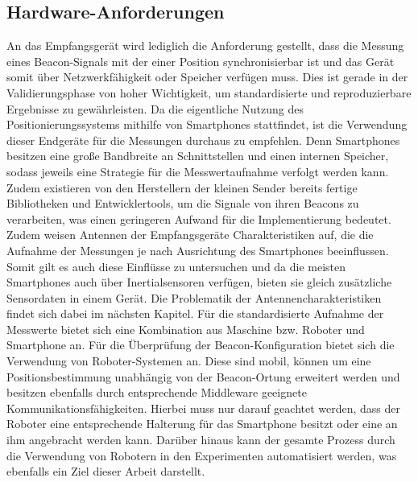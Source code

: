 \subsection{Hardware-Anforderungen}
An das Empfangsgerät wird lediglich die Anforderung gestellt, dass die Messung eines Beacon-Signals mit der einer Position synchronisierbar ist und das Gerät somit über Netzwerkfähigkeit oder Speicher verfügen muss. Dies ist gerade in der Validierungsphase von hoher Wichtigkeit, um standardisierte und reproduzierbare Ergebnisse zu gewährleisten. Da die eigentliche Nutzung des Positionierungssystems mithilfe von Smartphones stattfindet, ist die Verwendung dieser Endgeräte für die Messungen durchaus zu empfehlen. Denn Smartphones besitzen eine große Bandbreite an Schnittstellen und einen internen Speicher, sodass jeweils eine Strategie für die Messwertaufnahme verfolgt werden kann. Zudem existieren von den Herstellern der kleinen Sender bereits fertige Bibliotheken und Entwicklertools, um die Signale von ihren Beacons zu verarbeiten, was einen geringeren Aufwand für die Implementierung bedeutet. Zudem weisen Antennen der Empfangsgeräte Charakteristiken auf, die die Aufnahme der Messungen je nach Ausrichtung des Smartphones beeinflussen. Somit gilt es auch diese Einflüsse zu untersuchen und da die meisten Smartphones auch über Inertialsensoren verfügen, bieten sie gleich zusätzliche Sensordaten in einem Gerät. Die Problematik der Antennencharakteristiken findet sich dabei im nächsten Kapitel. Für die standardisierte Aufnahme der Messwerte bietet sich eine Kombination aus Maschine bzw. Roboter und Smartphone an. Für die Überprüfung der Beacon-Konfiguration bietet sich die Verwendung von Roboter-Systemen an. Diese sind mobil, können um eine Positionsbestimmung unabhängig von der Beacon-Ortung erweitert werden und besitzen ebenfalls durch entsprechende Middleware geeignete Kommunikationsfähigkeiten. Hierbei muss nur darauf geachtet werden, dass der Roboter eine entsprechende Halterung für das Smartphone besitzt oder eine an ihm angebracht werden kann. Darüber hinaus kann der gesamte Prozess durch die Verwendung von Robotern in den Experimenten automatisiert werden, was ebenfalls ein Ziel dieser Arbeit darstellt.  

